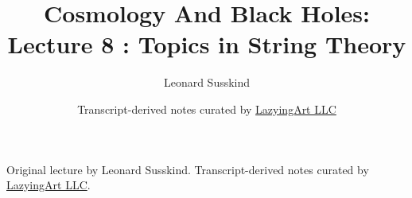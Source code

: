 \documentclass[11pt,oneside]{book}
\begin{document}
\frontmatter
\title{Cosmology And Black Holes: Lecture 8 : Topics in String Theory}
\author{Leonard Susskind}
\date{Transcript-derived notes curated by \href{https://lazying.art}{LazyingArt LLC}}
\maketitle
\begin{center}
\small Original lecture by Leonard Susskind. Transcript-derived notes curated by \href{https://lazying.art}{LazyingArt LLC}.
\end{center}
\clearpage
\mainmatter

\end{document}
